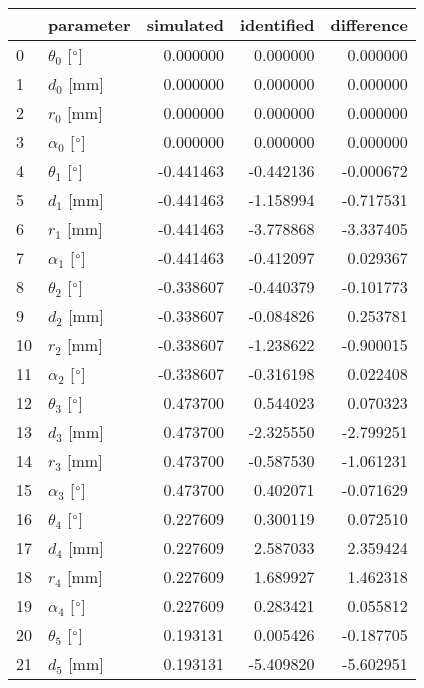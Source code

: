 \documentclass{standalone}%
\begin{document}
%
\normalsize%
\begin{tabular}{llrrr}
\toprule
{} &                 parameter & simulated & identified & difference \\
\midrule
0  &  $\theta_{0}$ [$\degree$] &  0.000000 &   0.000000 &   0.000000 \\
1  &              $d_{0}$ [mm] &  0.000000 &   0.000000 &   0.000000 \\
2  &              $r_{0}$ [mm] &  0.000000 &   0.000000 &   0.000000 \\
3  &  $\alpha_{0}$ [$\degree$] &  0.000000 &   0.000000 &   0.000000 \\
4  &  $\theta_{1}$ [$\degree$] & -0.441463 &  -0.442136 &  -0.000672 \\
5  &              $d_{1}$ [mm] & -0.441463 &  -1.158994 &  -0.717531 \\
6  &              $r_{1}$ [mm] & -0.441463 &  -3.778868 &  -3.337405 \\
7  &  $\alpha_{1}$ [$\degree$] & -0.441463 &  -0.412097 &   0.029367 \\
8  &  $\theta_{2}$ [$\degree$] & -0.338607 &  -0.440379 &  -0.101773 \\
9  &              $d_{2}$ [mm] & -0.338607 &  -0.084826 &   0.253781 \\
10 &              $r_{2}$ [mm] & -0.338607 &  -1.238622 &  -0.900015 \\
11 &  $\alpha_{2}$ [$\degree$] & -0.338607 &  -0.316198 &   0.022408 \\
12 &  $\theta_{3}$ [$\degree$] &  0.473700 &   0.544023 &   0.070323 \\
13 &              $d_{3}$ [mm] &  0.473700 &  -2.325550 &  -2.799251 \\
14 &              $r_{3}$ [mm] &  0.473700 &  -0.587530 &  -1.061231 \\
15 &  $\alpha_{3}$ [$\degree$] &  0.473700 &   0.402071 &  -0.071629 \\
16 &  $\theta_{4}$ [$\degree$] &  0.227609 &   0.300119 &   0.072510 \\
17 &              $d_{4}$ [mm] &  0.227609 &   2.587033 &   2.359424 \\
18 &              $r_{4}$ [mm] &  0.227609 &   1.689927 &   1.462318 \\
19 &  $\alpha_{4}$ [$\degree$] &  0.227609 &   0.283421 &   0.055812 \\
20 &  $\theta_{5}$ [$\degree$] &  0.193131 &   0.005426 &  -0.187705 \\
21 &              $d_{5}$ [mm] &  0.193131 &  -5.409820 &  -5.602951 \\

\end{tabular}
\end{document}
